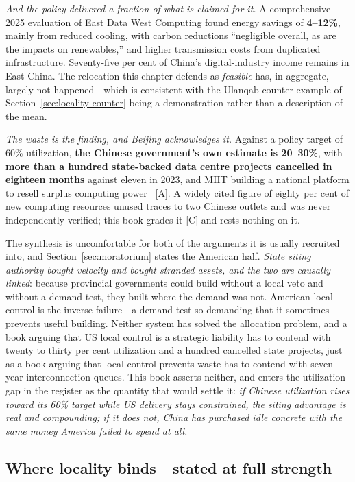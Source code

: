 \emph{And the policy delivered a fraction of what is claimed for it.} A comprehensive 2025 evaluation of East Data West Computing found energy savings of \textbf{4--12\%}, mainly from reduced cooling, with carbon reductions ``negligible overall, as are the impacts on renewables,'' and higher transmission costs from duplicated infrastructure. Seventy-five per cent of China's digital-industry income remains in East China. The relocation this chapter defends as \emph{feasible} has, in aggregate, largely not happened---which is consistent with the Ulanqab counter-example of Section~\ref{sec:locality-counter} being a demonstration rather than a description of the mean.

\emph{The waste is the finding, and Beijing acknowledges it.} Against a policy target of 60\% utilization, \textbf{the Chinese government's own estimate is 20--30\%}, with \textbf{more than a hundred state-backed data centre projects cancelled in eighteen months} against eleven in 2023, and MIIT building a national platform to resell surplus computing power~\cite{china-dc-utilization} [A]. A widely cited figure of eighty per cent of new computing resources unused traces to two Chinese outlets and was never independently verified; this book grades it [C] and rests nothing on it.

The synthesis is uncomfortable for both of the arguments it is usually recruited into, and Section~\ref{sec:moratorium} states the American half. \emph{State siting authority bought velocity and bought stranded assets, and the two are causally linked}: because provincial governments could build without a local veto and without a demand test, they built where the demand was not. American local control is the inverse failure---a demand test so demanding that it sometimes prevents useful building. Neither system has solved the allocation problem, and a book arguing that US local control is a strategic liability has to contend with twenty to thirty per cent utilization and a hundred cancelled state projects, just as a book arguing that local control prevents waste has to contend with seven-year interconnection queues. This book asserts neither, and enters the utilization gap in the register as the quantity that would settle it: \emph{if Chinese utilization rises toward its 60\% target while US delivery stays constrained, the siting advantage is real and compounding; if it does not, China has purchased idle concrete with the same money America failed to spend at all.}

\subsection{Where locality binds---stated at full strength}


